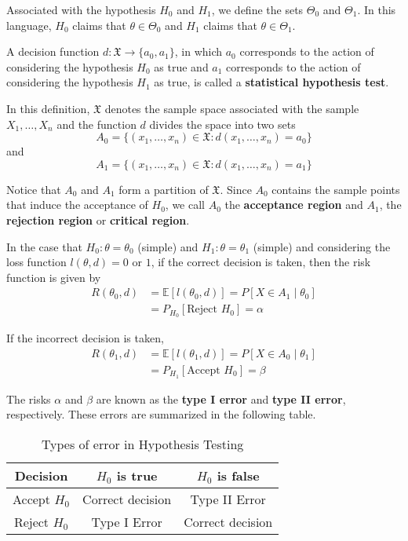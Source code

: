 \documentclass[12pt,a4paper]{report}
\begin{document}
Associated with the hypothesis $H_0$ and $H_1$, we define the sets $\Theta_0$ and $\Theta_1$. In this language, $H_0$ claims that $\theta \in \Theta_0$ and $H_1$ claims that $\theta \in \Theta_1$. 

\begin{definition}
    A decision function $d : \mathfrak{X} \longrightarrow \{ a_0, a_1 \}$, in which $a_0$ corresponds to the action of considering the hypothesis $H_0$ as true and $a_1$ corresponds to the action of considering the hypothesis $H_1$ as true, is called a \textbf{statistical hypothesis test}.
\end{definition}

In this definition, $\mathfrak{X}$ denotes the sample space associated with the sample $X_1, \ldots, X_n$ and the function $d$ divides the space into two sets
\[
    A_0 = \{ (x_1, \ldots, x_n ) \in \mathfrak{X} : d(x_1, \ldots, x_n) = a_0 \}
\]
and 
\[
    A_1 = \{ (x_1, \ldots, x_n ) \in \mathfrak{X} : d(x_1, \ldots, x_n) = a_1 \}
\]

Notice that $A_0$ and $A_1$ form a partition of $\mathfrak{X}$. Since $A_0$ contains the sample points that induce the acceptance of $H_0$, we call $A_0$ the \textbf{acceptance region} and $A_1$, the \textbf{rejection region} or \textbf{critical region}.

In the case that $H_0: \theta = \theta_0$ (simple) and $H_1: \theta = \theta_1$ (simple) and considering the loss function $l(\theta, d) = 0$ or $1$, if the correct decision is taken, then the risk function is given by 
\begin{align*}
    R(\theta_0, d) &= \mathbb{E}[l(\theta_0, d)] =P[X \in A_1 \mid \theta_0] \\
    &= P_{H_0}[\text{Reject } H_0] = \alpha
\end{align*}

If the incorrect decision is taken, 
\begin{align*}
    R(\theta_1, d) &= \mathbb{E}[l(\theta_1, d)] =P[X \in A_0 \mid \theta_1] \\
    &= P_{H_1}[\text{Accept } H_0] = \beta
\end{align*}

The risks $\alpha$ and $\beta$ are known as the \textbf{type I error} and \textbf{type II error}, respectively. These errors are summarized in the following table.

\begin{table}[h]
    \begin{center}
        \caption[]{Types of error in Hypothesis Testing}
        \begin{tabular}{c|c|c}
        \hline
        Decision     & $H_0$ is true    & $H_0$ is false   \\
        \hline
        Accept $H_0$ & Correct decision & Type II Error    \\
        Reject $H_0$ & Type I Error     & Correct decision \\
        \hline
        \end{tabular}
    \end{center}
\end{table}
\end{document}
